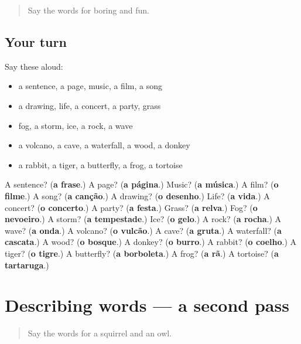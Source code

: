 \label{lesson:PT-R123-first-pass-animals-the-body-and-colours}



\begin{quote}
Say the words for boring and fun.
\end{quote}

\subsection*{Your turn}
Say these aloud:

\begin{itemize}
\raggedright
  \item a sentence, a page, music, a film, a song
  \item a drawing, life, a concert, a party, grass
  \item fog, a storm, ice, a rock, a wave
  \item a volcano, a cave, a waterfall, a wood, a donkey
  \item a rabbit, a tiger, a butterfly, a frog, a tortoise
\end{itemize}

\begin{tcolorbox}[breakable,colback=teal!4,colframe=teal!35!black,title={Before you move on}]
A sentence? (\textbf{a frase}.) A page? (\textbf{a página}.) Music? (\textbf{a música}.) A film? (\textbf{o filme}.) A song? (\textbf{a canção}.) A drawing? (\textbf{o desenho}.) Life? (\textbf{a vida}.) A concert? (\textbf{o concerto}.) A party? (\textbf{a festa}.) Grass? (\textbf{a relva}.) Fog? (\textbf{o nevoeiro}.) A storm? (\textbf{a tempestade}.) Ice? (\textbf{o gelo}.) A rock? (\textbf{a rocha}.) A wave? (\textbf{a onda}.) A volcano? (\textbf{o vulcão}.) A cave? (\textbf{a gruta}.) A waterfall? (\textbf{a cascata}.) A wood? (\textbf{o bosque}.) A donkey? (\textbf{o burro}.) A rabbit? (\textbf{o coelho}.) A tiger? (\textbf{o tigre}.) A butterfly? (\textbf{a borboleta}.) A frog? (\textbf{a rã}.) A tortoise? (\textbf{a tartaruga}.)
\end{tcolorbox}
\section[(dialogue)]{Describing words — a second pass}

\label{lesson:PT-R123-second-pass-describing-words}



\begin{quote}
Say the words for a squirrel and an owl.
\end{quote}

